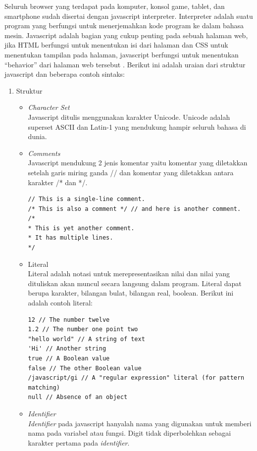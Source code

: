 Seluruh browser yang terdapat pada komputer, konsol game, tablet, dan smartphone
sudah disertai dengan javascript interpreter. Interpreter adalah suatu program yang berfungsi 
untuk menerjemahkan kode program ke dalam bahasa mesin. Javascript adalah bagian yang 
cukup penting pada sebuah halaman web, jika HTML 
berfungsi untuk menentukan isi dari halaman dan CSS untuk menentukan tampilan pada halaman, javascript 
berfungsi untuk menentukan ``behavior'' dari halaman web tersebut
\cite{Flanagan:2011}.
Berikut ini adalah uraian dari struktur javascript dan beberapa contoh sintaks:
\begin{enumerate}
\item Struktur

\begin{itemize}
\item \textit{Character Set} \\
Javascript ditulis menggunakan karakter Unicode. Unicode adalah superset ASCII dan Latin-1 yang mendukung 
hampir seluruh bahasa di dunia.

\item \textit{Comments} \\
Javascript mendukung 2 jenis komentar yaitu komentar yang diletakkan setelah garis miring ganda // dan komentar yang 
diletakkan antara karakter /* dan */.
\begin{verbatim}
// This is a single-line comment.
/* This is also a comment */ // and here is another comment.
/*
* This is yet another comment.
* It has multiple lines.
*/
\end{verbatim}

\item Literal \\
Literal adalah notasi untuk merepresentasikan nilai 
dan nilai yang dituliskan akan muncul secara langsung dalam program. Literal
dapat berupa karakter, bilangan bulat, bilangan real, boolean. Berikut
ini adalah contoh literal:
\begin{verbatim}
12 // The number twelve
1.2 // The number one point two
"hello world" // A string of text
'Hi' // Another string
true // A Boolean value
false // The other Boolean value
/javascript/gi // A "regular expression" literal (for pattern matching)
null // Absence of an object 
\end{verbatim}

\item \textit{Identifier} \\
\textit{Identifier} pada javascript hanyalah nama yang digunakan untuk memberi
nama pada variabel atau fungsi. Digit tidak diperbolehkan sebagai karakter
pertama pada \textit{identifier}.


\end{itemize}
\end{enumerate}
